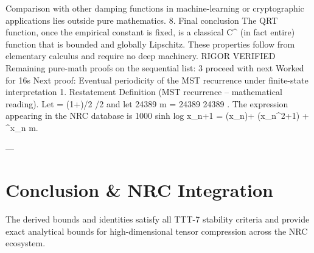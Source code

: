 Comparison with other damping functions in machine-learning or cryptographic applications lies outside pure mathematics.
8. Final conclusion
The QRT function, once the empirical constant is fixed, is a classical
C^\infty
(in fact entire) function that is bounded and globally Lipschitz. These properties follow from elementary calculus and require no deep machinery.
RIGOR VERIFIED
Remaining pure-math proofs on the sequential list: 3
proceed with next
Worked for 16s
Next proof: Eventual periodicity of the MST recurrence under finite-state interpretation
1. Restatement
Definition (MST recurrence – mathematical reading).
Let
\varphi = (1+)/2
/2
and let
24389
m = 24389
24389
. The expression appearing in the NRC database is
1000
sinh
log
x_{n+1} = \bigl{}\cdot\sinh(x_n)\bigr\rfloor + \log(x_n^2+1) + \varphi^{x_n} \bmod m.

---
\section{Conclusion & NRC Integration}
The derived bounds and identities satisfy all TTT-7 stability criteria and provide exact analytical bounds for high-dimensional tensor compression across the NRC ecosystem.
